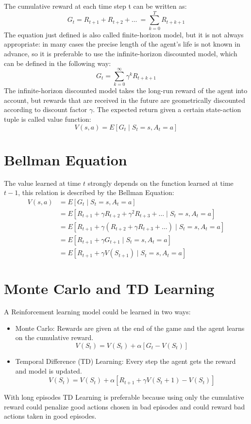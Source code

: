 \documentclass[Lau,oneside,noexaminfo]{sapthesis} %
\begin{document}
The cumulative reward at each time step  t can be written as:
\begin{equation}
G_t = R_{t+1} + R_{t+2} + \dots\ = \sum_{k=0}^{T}R_{t+k+1}
\end{equation}
The equation just defined is also called finite-horizon model, but it is not always appropriate: in many cases the precise length of the agent's life is not known in advance, so it is preferable to use the infinite-horizon discounted model, which can be defined in the following way:
\begin{equation}
G_t = \sum_{k=0}^{\infty}\gamma^k R_{t+k+1}
\end{equation}
The infinite-horizon discounted model takes the long-run reward of the agent into account, but rewards that are received in the future are geometrically discounted according to discount factor $\gamma$.
The expected return given a certain state-action tuple is called value function:
\begin{equation}
V(s,a) = E[G_t \mid S_t=s, A_t = a]
\end{equation}
\section{Bellman Equation}
The value learned at time $t$ strongly depends on the function learned at time $t-1$, this relation is described by the Bellman Equation:
\begin{align}
V(s, a) &= E[G_t \mid S_t=s, A_t = a] \\
&= E[R_{t+1} + \gamma R_{t+2} + \gamma^2 R_{t+3} + \dots \mid S_t=s, A_t = a] \\
&= E[R_{t+1} + \gamma (R_{t+2} + \gamma R_{t+3} + \dots) \mid S_t=s, A_t = a] \\
&= E[R_{t+1} + \gamma G_{t+1} \mid S_t=s, A_t = a] \\
&= E[R_{t+1} + \gamma V(S_{t+1}) \mid S_t=s, A_t = a]
\end{align}
\section{Monte Carlo and TD Learning}
A Reinforcement learning model could be learned in two ways:
\begin{itemize}
	\item Monte Carlo: Rewards are given at the end of the game and the agent learns on the cumulative reward.
	\begin{equation}
V( S_t ) = V( S_t ) + \alpha[ G_t - V(S_t) ]
	\end{equation}
	\item Temporal Difference (TD) Learning: Every step the agent gets the reward and model is updated.
	\begin{equation}
V( S_t ) = V( S_t ) + \alpha[ R_{t+1} + \gamma V(S_t+1)- V(S_t) ]
	\end{equation}
\end{itemize}
With long episodes TD Learning is preferable because using only the cumulative reward could penalize good actions chosen in bad episodes and could reward bad actions taken in good episodes.
\end{document}
